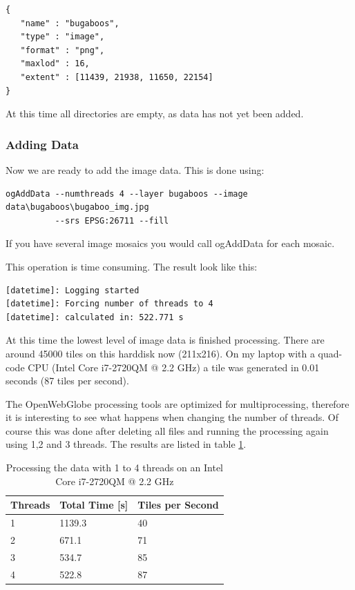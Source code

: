 \documentclass[
	12pt,
	a4paper,
	english,	
	appendixprefix,				     			        
	openany,		     	
	abstracton,		    		    
 	BCOR8mm,		    
]{scrartcl}
\begin{document}
\begin{lstlisting}
{
   "name" : "bugaboos",
   "type" : "image",
   "format" : "png",
   "maxlod" : 16,
   "extent" : [11439, 21938, 11650, 22154]
}
\end{lstlisting}

At this time all directories are empty, as data has not yet been added.

\subsubsection{Adding Data}

Now we are ready to add the image data. This is done using:

\begin{lstlisting}
ogAddData --numthreads 4 --layer bugaboos --image data\bugaboos\bugaboo_img.jpg 
          --srs EPSG:26711 --fill
\end{lstlisting}

If you have several image mosaics you would call ogAddData for each mosaic.

This operation is time consuming. The result look like this:

\begin{lstlisting}
[datetime]: Logging started
[datetime]: Forcing number of threads to 4
[datetime]: calculated in: 522.771 s
\end{lstlisting}

At this time the lowest level of image data is finished processing. There are around 45000 tiles on this harddisk now (211x216). On my laptop with a quad-code CPU (Intel Core i7-2720QM @ 2.2 GHz) a tile was generated in 0.01 seconds (87 tiles per second).

The OpenWebGlobe processing tools are optimized for multiprocessing, therefore it is interesting to see what happens when changing the number of threads. Of course this was done after deleting all files and running the processing again using 1,2 and 3 threads. The results are listed in table \ref{imgbenchmark}.

\begin{table}[H]
\centering
\begin{tabular}{|l|l|l|}
\hline
\textbf{Threads}	& \textbf{Total Time [s]} & \textbf{Tiles per Second}\\
\hline
1 & 1139.3 & 40\\
\hline
2 & 671.1 & 71\\
\hline
3 & 534.7 & 85\\
\hline
4 & 522.8 & 87\\
\hline
\end{tabular}
\caption{Processing the data with 1 to 4 threads on an Intel Core i7-2720QM @ 2.2 GHz}\label{imgbenchmark}
\end{table}
\end{document}
